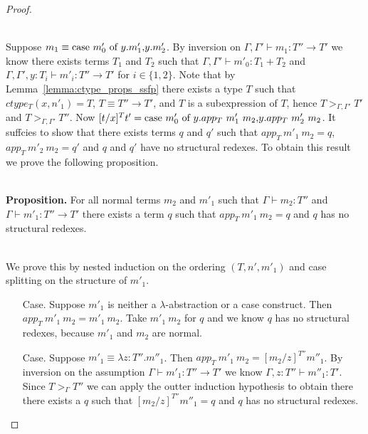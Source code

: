 \begin{proof}
\begin{itemize}
  \ \\
  Suppose $m_1 \equiv \mbox{case}\ m'_0\ \text{of}\ y\text{.}m'_1\text{,}y\text{.}m'_2$.
  By inversion on
  $\Gamma,\Gamma' \vdash m_1 : T'' \to T'$ we know there exists terms $T_1$ and $T_2$ such that
  $\Gamma,\Gamma' \vdash m'_0:T_1+T_2$ and
  $\Gamma,\Gamma',y:T_i \vdash m'_i:T'' \to T'$
  for $i \in \{1,2\}$.  Note that by Lemma~\ref{lemma:ctype_props_ssfp} there exists a type $T$ such that 
  $ctype_T(x, n'_1) = T$, $T \equiv T'' \to T'$, and $T$ is a subexpression
  of $T$, hence $T >_{\Gamma,\Gamma'} T'$ and $T >_{\Gamma,\Gamma'} T''$.  
  Now $[t/x]^T t' = \ccon{m'_0}{y}{app_T\ m'_1\ m_2}{app_T\ m'_2\ m_2}$.  It suffcies to show that
  there exists terms $q$ and $q'$ such that $app_T\ m'_1\ m_2 = q$, $app_T\ m'_2\ m_2 = q'$ and $q$ and $q'$ have
  no structural redexes.  To obtain this result we prove the following proposition.
  
  \ \\
  {\bf Proposition.}  For all normal terms $m_2$ and $m'_1$ such that  
  $\Gamma \vdash m_2 : T''$ and $\Gamma \vdash m'_1:T'' \to T'$
  there exists a term $q$ such that $app_T\ m'_1\ m_2 = q$ and $q$ has no structural redexes.
  
  \ \\
  We prove this by nested induction on the ordering $(T, n', m'_1)$ and case splitting on 
  the structure of $m'_1$.
  \begin{itemize}
  \item[Case.] Suppose $m'_1$ is neither a $\lambda$-abstraction or a case construct.  Then
    $app_T\  m'_1\ m_2 = m'_1\ m_2$.  Take $m'_1\ m_2$ for $q$ and we know $q$ has no structural
    redexes, because $m'_1$ and $m_2$ are normal.
    
  \item[Case.] Suppose $m'_1 \equiv \lambda z:T''.m''_1$.  Then $app_T\ m'_1\ m_2 = [m_2/z]^{T''} m''_1$.
    By inversion on the assumption $\Gamma \vdash m'_1:T'' \to T'$ we know 
    $\Gamma,z:T'' \vdash m''_1:T'$.  Since $T >_{\Gamma} T''$ we can apply the outter induction
    hypothesis to obtain there there exists a $q$ such that $[m_2/z]^{T''} m''_1 = q$ and 
    $q$ has no structural redexes.
    

\end{itemize}
\end{itemize}
\end{proof}
